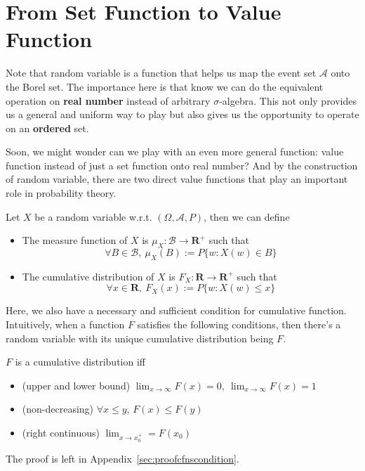 \documentclass[../Probability_Theory.tex]{subfiles}
\begin{document}
\section{From Set Function to Value Function}
Note that random variable is a function that helps us map the event set $\mathcal{A}$ onto the Borel set. The importance here is that know we can do the equivalent operation on {\bf real number} instead of arbitrary $\sigma$-algebra. This not only provides us a general and uniform way to play but also gives us the opportunity to operate on an {\bf ordered} set.

Soon, we might wonder can we play with an even more general function: value function instead of just a set function onto real number? And by the construction of random variable, there are two direct value functions that play an important role in probability theory.
\begin{theorem}
	Let $X$ be a random variable w.r.t. $(\Omega,\mathcal{A},P)$, then we can define
	\begin{itemize}
		\item The measure function of $X$ is $\mu_X:\mathcal{B}\rightarrow\mathbf{R}^+$ such that $$\forall B\in\mathcal{B},\ \mu_X(B):=P\{w:X(w)\in B\}$$
		\item The cumulative distribution of $X$ is $F_X:\mathbf{R}\rightarrow\mathbf{R}^+$ such that $$\forall x\in\mathbf{R},\ F_X(x):=P\{w:X(w)\leq x \}$$
	\end{itemize}
\end{theorem}

Here, we also have a necessary and sufficient condition for cumulative function. Intuitively, when a function $F$ satisfies the following conditions, then there's a random variable with its unique cumulative distribution being $F$.

\begin{theorem}\label{cdnscondition}
	$F$ is a cumulative distribution iff
	\begin{itemize}
		\item (upper and lower bound) $\lim_{x\rightarrow\infty}F(x)=0,\ \lim_{x\rightarrow\infty}F(x) = 1$
		\item (non-decreasing) $\forall x\leq y$, $F(x)\leq F(y)$
		\item (right continuous) $\lim_{x\rightarrow x_0^+} = F(x_0)$
	\end{itemize}
\end{theorem}
The proof is left in Appendix~\ref{sec:proofcfnscondition}.
\end{document}
